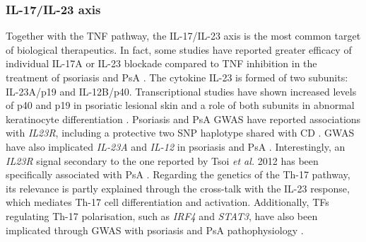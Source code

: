 \subsubsection*{IL-17/IL-23 axis}
Together with the TNF pathway, the IL-17/IL-23 axis is the most common target of biological therapeutics. In fact, some studies have reported greater efficacy of individual IL-17A or IL-23 blockade compared to TNF inhibition in the treatment of psoriasis and PsA \parencite{Griffiths2015,Blauvelt2017}. 
The cytokine IL-23 is formed of two subunits: IL-23A/p19 and IL-12B/p40. Transcriptional studies have shown increased levels of p40 and p19 in psoriatic lesional skin and a role of both subunits in abnormal keratinocyte differentiation \parencite{Lee2004,Zhu2012}. Psoriasis and PsA GWAS have reported associations with \textit{IL23R}, including a protective two SNP haplotype shared with CD \parencite{Nair2008, Strange2010, Tsoi2012}. GWAS have also implicated \textit{IL-23A} and \textit{IL-12} in psoriasis and PsA \parencite{Cargill2007,Strange2010,Tsoi2012,Patrick2018}.
Interestingly, an \textit{IL23R} signal secondary to the one reported by Tsoi \textit{et al.} 2012 has been specifically associated with PsA \parencite{Bowes2015}. Regarding the genetics of the Th-17 pathway, its relevance is partly explained through the cross-talk with the IL-23 response, which mediates Th-17 cell differentiation and activation. Additionally, TFs regulating Th-17 polarisation, such as \textit{IRF4} and \textit{STAT3}, have also been implicated through GWAS with psoriasis and PsA pathophysiology \parencite{Tsoi2012,Huber2008,Harris2007}. 



